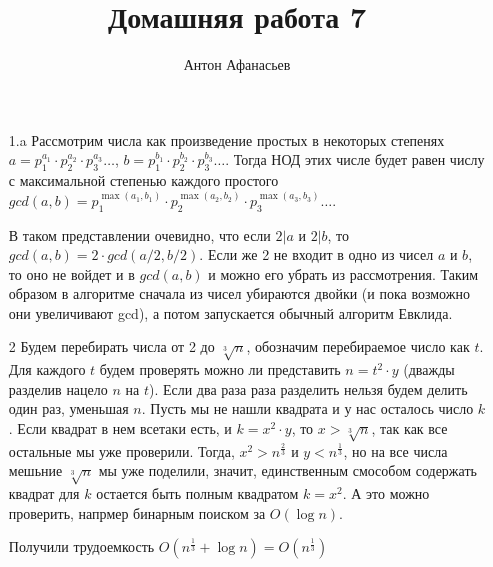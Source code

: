 \documentclass[10pt]{article}
\begin{document}
\title{Домашняя работа 7}
\author{Антон Афанасьев}
\maketitle

\begin{enumerate}
	\item[1.a] Рассмотрим числа как произведение простых в некоторых степенях $a = p_1 ^{a_1} \cdot p_2^{a_2} \cdot p_3^{a_3} \ldots$, $b = p_1^{b_1} \cdot p_2^{b_2} \cdot p_3^{b_3} \ldots$. Тогда НОД этих числе будет равен числу с максимальной степенью каждого простого $gcd(a, b) = p_1^{\max(a_1, b_1)} \cdot p_2^{\max(a_2, b_2)} \cdot p_3^{\max(a_3, b_3)} \ldots$.
	
	В таком представлении очевидно, что если $2 | a$ и $2 | b$, то $gcd(a, b) = 2 \cdot gcd(a/2, b/2)$. Если же 2 не входит в одно из чисел $a$ и $b$, то оно не войдет и в $gcd(a, b)$ и можно его убрать из рассмотрения. Таким образом в алгоритме сначала из чисел убираются двойки (и пока возможно они увеличивают gcd), а потом запускается обычный алгоритм Евклида.
	
	\item[2] Будем перебирать числа от 2 до $\sqrt[3]{n}$, обозначим перебираемое число как $t$. Для каждого $t$ будем проверять можно ли представить $n = t^2 \cdot y$ (дважды разделив нацело $n$ на $t$). Если два раза раза разделить нельзя будем делить один раз, уменьшая $n$. Пусть мы не нашли квадрата и у нас осталось число $k$. Если квадрат в нем всетаки есть, и $k = x^2 \cdot y$, то $x > \sqrt[3]{n}$, так как все остальные мы уже проверили. Тогда, $x^2 > n^{\frac{2}{3}}$ и $y < n^{\frac{1}{3}}$, но на все числа мешьние $\sqrt[3]{n}$ мы уже поделили, значит, единственным смособом содержать квадрат для $k$ остается быть полным квадратом $k = x^2$. А это можно проверить, напрмер бинарным поиском за $O(\log n)$.
	
	Получили трудоемкость $O(n^{\frac{1}{3}} + \log n) = O(n^{\frac{1}{3}})$
	\end{enumerate}
\end{document}
